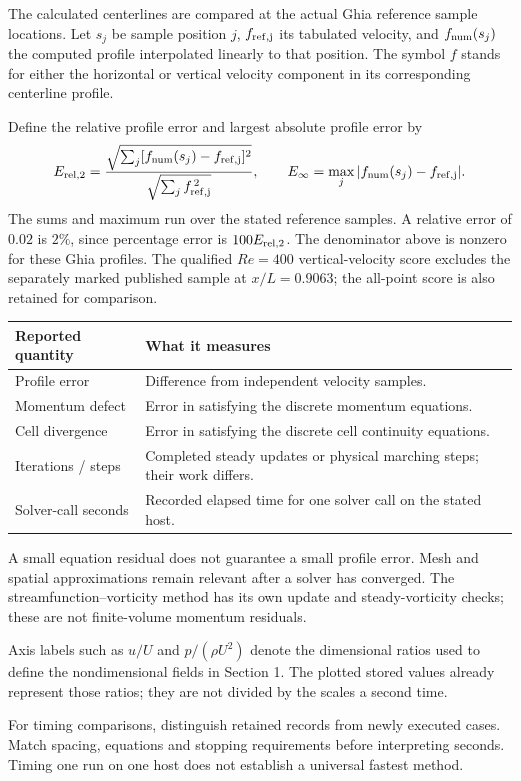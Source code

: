 The calculated centerlines are compared at the actual Ghia reference sample
locations. Let $s_j$ be sample position $j$, $f_{\rm ref,j}$ its tabulated
velocity, and $f_{\rm num}(s_j)$ the computed profile interpolated linearly
to that position. The symbol $f$ stands for either the horizontal or vertical
velocity component in its corresponding centerline profile.

Define the relative profile error and largest absolute profile error by
\[
E_{{\rm rel},2}=\frac{\sqrt{\sum_j[f_{\rm num}(s_j)-f_{\rm ref,j}]^2}}
{\sqrt{\sum_j f_{\rm ref,j}^{\,2}}},\qquad
E_\infty=\max_j|f_{\rm num}(s_j)-f_{\rm ref,j}|.
\]
The sums and maximum run over the stated reference samples. A relative error
of $0.02$ is $2\%$, since percentage error is $100E_{{\rm rel},2}$.
The denominator above is nonzero for these Ghia profiles. The qualified
$Re=400$ vertical-velocity score excludes the separately marked published
sample at $x/L=0.9063$; the all-point score is also retained for comparison.

\begin{center}\begin{tabular}{lp{.68\linewidth}}\toprule
Reported quantity & What it measures\\\midrule
Profile error & Difference from independent velocity samples.\\
Momentum defect & Error in satisfying the discrete momentum equations.\\
Cell divergence & Error in satisfying the discrete cell continuity equations.\\
Iterations / steps & Completed steady updates or physical marching steps; their work differs.\\
Solver-call seconds & Recorded elapsed time for one solver call on the stated host.\\\bottomrule
\end{tabular}\end{center}
A small equation residual does not guarantee a small profile error. Mesh and
spatial approximations remain relevant after a solver has converged. The
streamfunction--vorticity method has its own update and steady-vorticity
checks; these are not finite-volume momentum residuals.

Axis labels such as $u/U$ and $p/(\rho U^2)$ denote the dimensional ratios
used to define the nondimensional fields in Section 1. The plotted stored
values already represent those ratios; they are not divided by the scales
a second time.

For timing comparisons, distinguish retained records from newly executed
cases. Match spacing, equations and stopping requirements before interpreting
seconds. Timing one run on one host does not establish a universal fastest
method.
